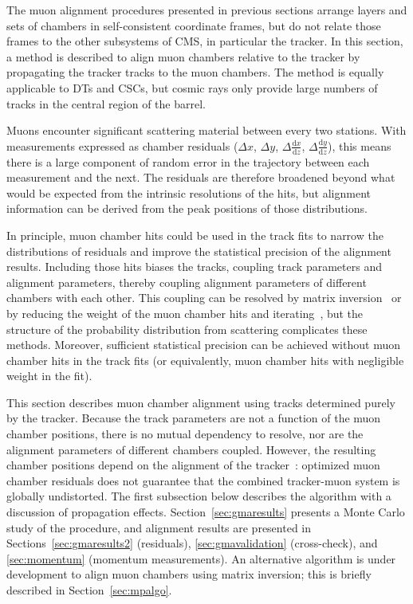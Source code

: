 The muon alignment procedures presented in previous sections arrange
layers and sets of chambers in self-consistent coordinate frames, but
do not relate those frames to the other subsystems of CMS, in
particular the tracker.  In this section, a method is described to
align muon chambers relative to the tracker by propagating the tracker
tracks to the muon chambers.  The method is equally applicable to DTs
and CSCs, but cosmic rays only provide large numbers of tracks in the
central region of the barrel.

Muons encounter significant scattering material between every two
stations.  With measurements expressed as chamber residuals
($\Delta x$, $\Delta y$, $\Delta \frac{\textrm{d}x}{\textrm{d}z}$,
$\Delta \frac{\textrm{d}y}{\textrm{d}z}$), this means there is a large component of
random error in the trajectory between each measurement and the next.
The residuals are therefore broadened beyond what would be expected
from the intrinsic resolutions of the hits, but alignment information
can be derived from the peak positions of those distributions.

In principle, muon chamber hits could be used in the track fits to
narrow the distributions of residuals and improve the statistical
precision of the alignment results.  Including those hits biases the tracks,
coupling track parameters and alignment parameters, thereby coupling
alignment parameters of different chambers with each other.  This coupling can be
resolved by matrix inversion~\cite{Blobel:2006yh} or by reducing the
weight of the muon chamber hits and iterating~\cite{Karimaki:2003bd}, but
the structure of the probability distribution from scattering
complicates these methods.  Moreover, sufficient statistical precision
can be achieved without muon chamber hits in the track fits (or
equivalently, muon chamber hits with negligible weight in the fit).

This section describes muon chamber alignment using tracks
determined purely by the tracker.  Because the track parameters are
not a function of the muon chamber positions, there is no mutual
dependency to resolve, nor are the alignment parameters of different
chambers coupled.  However, the resulting chamber positions depend on
the alignment of the tracker~\cite{Collaboration:2009sr}: optimized
muon chamber residuals does not guarantee that the combined
tracker-muon system is globally undistorted.  The first subsection
below describes the algorithm with a discussion of propagation
effects.  Section~\ref{sec:gmaresults} presents a Monte Carlo study
of the procedure, and alignment results are presented in
Sections~\ref{sec:gmaresults2} (residuals),
\ref{sec:gmavalidation} (cross-check), and \ref{sec:momentum} (momentum measurements).
An alternative algorithm is under development to align muon chambers
using matrix inversion; this is briefly described in
Section~\ref{sec:mpalgo}.

